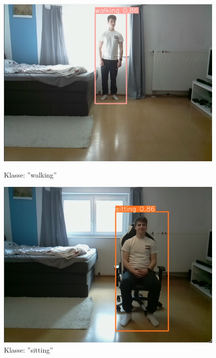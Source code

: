 \begin{figure}[H]
	\centering
	\begin{minipage}[b]{0.3\textwidth}
		\centering
		\includegraphics[width=\textwidth]{images/walking.png}
		\caption*{Klasse: ''walking''}
	\end{minipage}
	\hfill
	\begin{minipage}[b]{0.3\textwidth}
		\centering
		\includegraphics[width=\textwidth]{images/sitting.png}
		\caption*{Klasse: ''sitting''}
	\end{minipage}
	\hfill
	\begin{minipage}[b]{0.3\textwidth}
		\centering

\end{minipage}
\end{figure}
